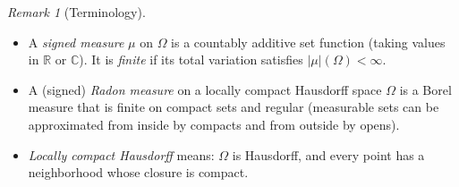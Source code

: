 \documentclass[11pt]{article}
\theoremstyle{definition}
\theoremstyle{remark}
\newtheorem{remark}{Remark}
\begin{document}
\begin{remark}[Terminology]
\begin{itemize}
    \item A \emph{signed measure} $\mu$ on $\Omega$ is a countably additive set function (taking values in $\mathbb{R}$ or $\mathbb{C}$). It is \emph{finite} if its total variation satisfies $|\mu|(\Omega)<\infty$.
    \item A (signed) \emph{Radon measure} on a locally compact Hausdorff space $\Omega$ is a Borel measure that is finite on compact sets and regular (measurable sets can be approximated from inside by compacts and from outside by opens).
    \item \emph{Locally compact Hausdorff} means: $\Omega$ is Hausdorff, and every point has a neighborhood whose closure is compact.
\end{itemize}
\end{remark}
\end{document}
